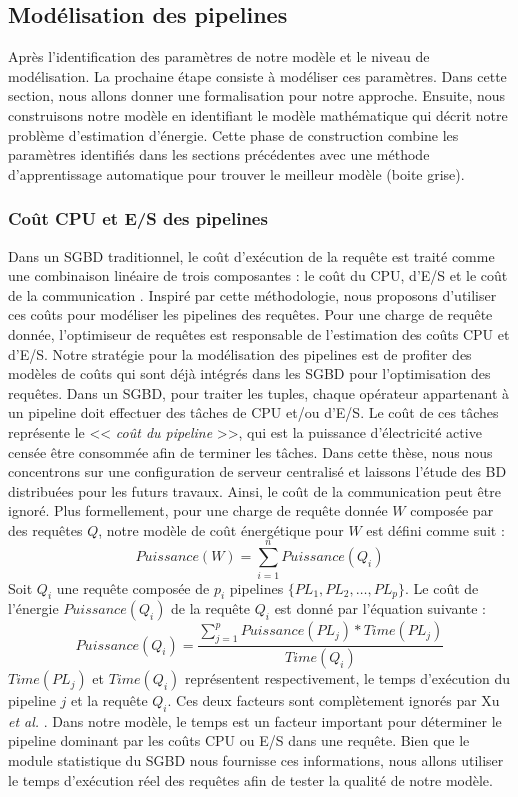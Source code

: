 \subsection{Modélisation des pipelines}
Après l'identification des paramètres de notre modèle et le niveau de modélisation. La prochaine étape consiste à modéliser ces paramètres. Dans cette section, nous allons donner une formalisation pour notre approche. Ensuite, nous construisons notre modèle en identifiant le modèle mathématique qui décrit notre problème d'estimation d'énergie. Cette phase de construction combine les paramètres identifiés dans les sections précédentes avec une méthode d'apprentissage automatique pour trouver le meilleur modèle (boite grise).

\subsubsection{Coût CPU et E/S des pipelines}
Dans un SGBD traditionnel, le coût d'exécution de la requête est traité comme une combinaison linéaire de trois composantes : le coût du CPU, d'E/S et le coût de la communication \cite{Xu13}. Inspiré par cette méthodologie, nous proposons d'utiliser ces coûts pour modéliser les pipelines des requêtes.
Pour une charge de requête donnée, l'optimiseur de requêtes est responsable de l'estimation des coûts CPU et d'E/S. Notre stratégie pour la modélisation des pipelines est de profiter des modèles de coûts qui sont déjà intégrés dans les SGBD pour l'optimisation des requêtes. Dans un SGBD, pour traiter les tuples, chaque opérateur appartenant à un pipeline doit effectuer des tâches de CPU et/ou d'E/S. Le coût de ces tâches représente le << \textit{coût du pipeline} >>, qui est la puissance d'électricité active censée être consommée afin de terminer les tâches. Dans cette thèse, nous nous concentrons sur une configuration de serveur centralisé et laissons l'étude des BD distribuées pour les futurs travaux. Ainsi, le coût de la communication peut être ignoré. Plus formellement, pour une charge de requête donnée $W$ composée par des requêtes $Q$, notre modèle de coût énergétique pour $W$ est défini comme suit :
\begin{equation}
Puissance(W) = \sum_{i=1}^{n} Puissance(Q_i)
\end{equation}
Soit $Q_i$ une requête composée de $p_i$ pipelines $\{PL_1, PL_2, \dots, PL_p\}$. Le coût de l'énergie $Puissance(Q_i)$ de la requête $Q_i$ est donné par l'équation suivante :
\begin{equation}
Puissance(Q_i) = \frac{\sum_{j=1}^{p} Puissance(PL_j) * Time(PL_j)}{Time(Q_i)}
\end{equation}
$Time(PL_j)$ et $Time(Q_i)$ représentent respectivement, le temps d'exécution du pipeline $j$ et la requête $Q_i$. Ces deux facteurs sont complètement ignorés par Xu \textit{et al.} \cite{Xu13}. Dans notre modèle, le temps est un facteur important pour déterminer le pipeline dominant par les coûts CPU ou E/S dans une requête. Bien que le module statistique du SGBD nous fournisse ces informations, nous allons utiliser le temps d'exécution réel des requêtes afin de tester la qualité de notre modèle.

